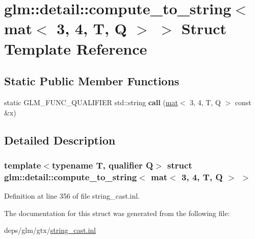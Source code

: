 \hypertarget{structglm_1_1detail_1_1compute__to__string_3_01mat_3_013_00_014_00_01T_00_01Q_01_4_01_4}{}\section{glm\+:\+:detail\+:\+:compute\+\_\+to\+\_\+string$<$ mat$<$ 3, 4, T, Q $>$ $>$ Struct Template Reference}
\label{structglm_1_1detail_1_1compute__to__string_3_01mat_3_013_00_014_00_01T_00_01Q_01_4_01_4}
\subsection*{Static Public Member Functions}
\begin{DoxyCompactItemize}
\item 
\mbox{\label{structglm_1_1detail_1_1compute__to__string_3_01mat_3_013_00_014_00_01T_00_01Q_01_4_01_4_ae80e1ea4b5f28839ab5e906afe2811c2}} 
static G\+L\+M\+\_\+\+F\+U\+N\+C\+\_\+\+Q\+U\+A\+L\+I\+F\+I\+ER std\+::string {\bfseries call} (\hyperlink{structglm_1_1mat}{mat}$<$ 3, 4, T, Q $>$ const \&x)
\end{DoxyCompactItemize}


\subsection{Detailed Description}
\subsubsection*{template$<$typename T, qualifier Q$>$\newline
struct glm\+::detail\+::compute\+\_\+to\+\_\+string$<$ mat$<$ 3, 4, T, Q $>$ $>$}



Definition at line 356 of file string\+\_\+cast.\+inl.



The documentation for this struct was generated from the following file\+:\begin{DoxyCompactItemize}
\item 
deps/glm/gtx/\hyperlink{string__cast_8inl}{string\+\_\+cast.\+inl}\end{DoxyCompactItemize}
